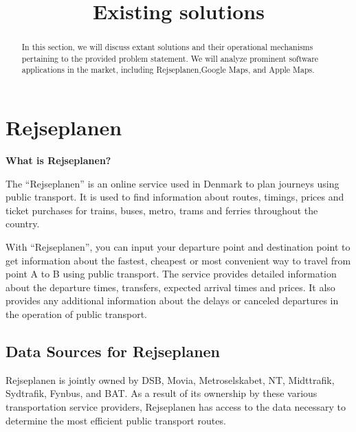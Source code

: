 \documentclass[11pt]{article}
\title{Existing solutions}
\begin{document}
    \maketitle
    \begin{abstract}
        In this section, we will discuss extant solutions and their operational mechanisms pertaining to the provided
        problem statement.
        We will analyze prominent software applications in the market,
        including Rejseplanen,Google Maps, and Apple Maps.
    \end{abstract}


    \section{Rejseplanen}\label{sec:rejseplanen}

    \textbf{What is Rejseplanen?}

    The ``Rejseplanen'' is an online service used in Denmark to plan journeys using public transport.
    It is used to find information about routes, timings, prices and ticket purchases for trains, buses, metro, trams and ferries
    throughout the country.\cite{Rejseplanen} \newline

    With ``Rejseplanen'', you can input your departure point and destination point to get information about the fastest,
    cheapest or most convenient way to travel from point A to B using public transport.
    The service provides detailed information about the departure times, transfers, expected arrival times and prices.
    It also provides any additional information about the delays or canceled departures in the operation of public transport.\cite{Rejseplanen}\newline

    \subsection{Data Sources for Rejseplanen}\label{subsec:where-does-rejseplanen-get-their-data-from?}

    Rejseplanen is jointly owned by DSB, Movia, Metroselskabet, NT, Midttrafik, Sydtrafik, Fynbus, and BAT.
    As a result of its ownership by these various transportation service providers, Rejseplanen has access to the
    data necessary to determine the most efficient public transport routes.
\end{document}
